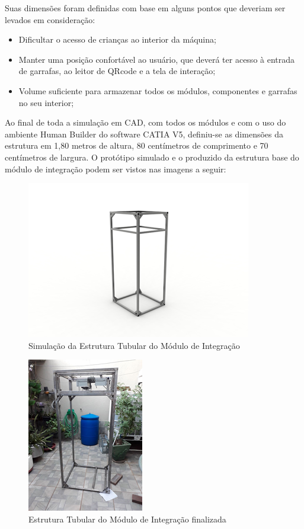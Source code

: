 Suas dimensões foram definidas com base em alguns pontos que deveriam ser levados em consideração: 

\begin{itemize}
    \item Dificultar o acesso de crianças ao interior da máquina;
    \item Manter uma posição confortável ao usuário, que deverá ter acesso à entrada de garrafas, ao leitor de QRcode e a tela de interação;
    \item Volume suficiente para armazenar todos os módulos, componentes e garrafas no seu interior;
\end{itemize}

Ao final de toda a simulação em CAD, com todos os módulos e com o uso do ambiente Human Builder do software CATIA V5, definiu-se as dimensões da estrutura em 1,80 metros de altura, 80 centímetros de comprimento e 70 centímetros de largura. O protótipo simulado e o produzido da estrutura base do módulo de integração podem ser vistos nas imagens a seguir:

\begin{figure}[!h]
	\centering
		\includegraphics[scale=1.0]{figuras/estrutura/29.png}
	\caption{Simulação da Estrutura Tubular do Módulo de Integração}
\end{figure}

\begin{figure}[!h]
	\centering
		\includegraphics[scale=1.1]{figuras/estrutura/30.png}
	\caption{Estrutura Tubular do Módulo de Integração finalizada}
\end{figure}

